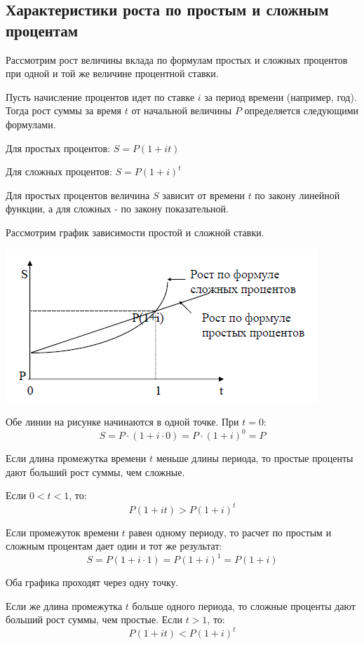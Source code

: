 \documentclass[aps,%
12pt,%
final,%
oneside,
onecolumn,%
musixtex, %
superscriptaddress,%
centertags]{article} %
\theoremstyle{plain}
\theoremstyle{definition}
\theoremstyle{remark}
\begin{document}

\subsection{Характеристики роста по простым и сложным процентам}

Рассмотрим рост величины вклада по формулам простых и сложных процентов при одной и той же величине процентной ставки.

Пусть начисление процентов идет по ставке $i$ за период времени (например, год). Тогда рост суммы за время $t$ от начальной величины $P$ определяется следующими формулами.

Для простых процентов: $S = P(1+it)$

Для сложных процентов: $S = P(1+i)^t$

Для простых процентов величина $S$ зависит от времени $t$ по закону линейной функции, а для сложных - по закону показательной.

Рассмотрим график зависимости простой и сложной ставки.

\begin{center}
	\includegraphics[scale=0.8]{images/a1.png}
\end{center}

Обе линии на рисунке начинаются в одной точке. При $t=0$:
$$S = P\cdot (1+i \cdot 0) = P\cdot (1+i)^0 = P$$

Если длина промежутка времени $t$ меньше длины периода, то простые проценты дают больший рост суммы, чем сложные.

Если $0 < t < 1$, то:
$$P(1+it) > P(1+i)^t$$

Если промежуток времени $t$ равен одному периоду, то расчет по простым и сложным процентам дает один и тот же результат:
$$S = P(1+i\cdot 1) = P(1+i)^{1} = P(1+i)$$

Оба графика проходят через одну точку. 

Если же длина промежутка $t$ больше одного периода, то сложные проценты дают больший рост суммы, чем простые. Если $t > 1$, то:
$$P(1+it) < P(1+i)^t$$
\end{document}
